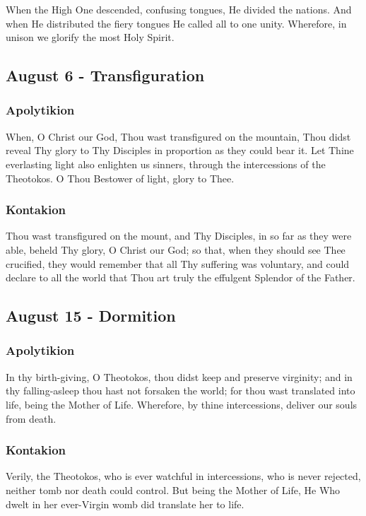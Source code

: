  When the High One descended, confusing tongues, He divided the nations. And when He distributed the fiery tongues He called all to one unity. Wherefore, in unison we glorify the most Holy Spirit.

\subsection{August 6 - Transfiguration}

\subsubsection{Apolytikion}

 When, O Christ our God, Thou wast transfigured on the mountain, Thou didst reveal Thy glory to Thy Disciples in proportion as they could bear it. Let Thine everlasting light also enlighten us sinners, through the intercessions of the Theotokos. O Thou Bestower of light, glory to Thee.


\subsubsection{Kontakion}

 Thou wast transfigured on the mount, and Thy Disciples, in so far as they were able, beheld Thy glory, O Christ our God; so that, when they should see Thee crucified, they would remember that all Thy suffering was voluntary, and could declare to all the world that Thou art truly the effulgent Splendor of the Father.

\subsection{August 15 - Dormition}

\subsubsection{Apolytikion}

 In thy birth-giving, O Theotokos, thou didst keep and preserve virginity; and in thy falling-asleep thou hast not forsaken the world; for thou wast translated into life, being the Mother of Life. Wherefore, by thine intercessions, deliver our souls from death.


\subsubsection{Kontakion}

 Verily, the Theotokos, who is ever watchful in intercessions, who is never rejected, neither tomb nor death could control. But being the Mother of Life, He Who dwelt in her ever-Virgin womb did translate her to life.
